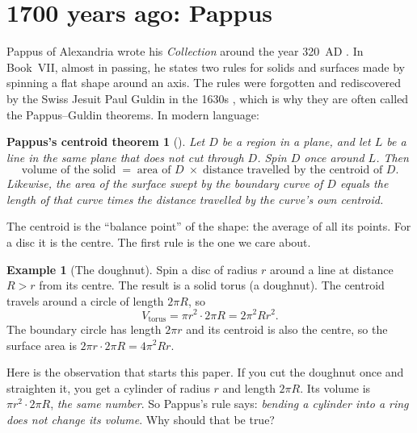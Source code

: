\documentclass[11pt]{article}
\theoremstyle{plain}
\newtheorem*{pappus}{Pappus's centroid theorem}
\theoremstyle{definition}
\newtheorem{example}[lemma]{Example}
\theoremstyle{remark}
\begin{document}
\tableofcontents

\section{1700 years ago: Pappus}\label{sec:history}

Pappus of Alexandria wrote his \emph{Collection} around the year 320~AD \cite{pappus}. In Book~VII, almost in passing, he states two rules for solids and surfaces made by spinning a flat shape around an axis. The rules were forgotten and rediscovered by the Swiss Jesuit Paul Guldin in the 1630s \cite{guldin}, which is why they are often called the Pappus--Guldin theorems. In modern language:

\begin{pappus}[\cite{pappus,guldin}]
Let $D$ be a region in a plane, and let $L$ be a line in the same plane that does not cut through $D$. Spin $D$ once around $L$. Then
\[
  \text{volume of the solid} \;=\; \text{area of } D \;\times\; \text{distance travelled by the centroid of } D .
\]
Likewise, the area of the surface swept by the boundary curve of $D$ equals the length of that curve times the distance travelled by the curve's own centroid.
\end{pappus}

The centroid is the ``balance point'' of the shape: the average of all its points. For a disc it is the centre. The first rule is the one we care about.

\begin{example}[The doughnut]\label{ex:torus}
Spin a disc of radius $r$ around a line at distance $R>r$ from its centre. The result is a solid torus (a doughnut). The centroid travels around a circle of length $2\pi R$, so
\[
  V_{\text{torus}} = \pi r^2 \cdot 2\pi R = 2\pi^2 R r^2 .
\]
The boundary circle has length $2\pi r$ and its centroid is also the centre, so the surface area is $2\pi r\cdot 2\pi R=4\pi^2Rr$.
\end{example}

Here is the observation that starts this paper. If you cut the doughnut once and straighten it, you get a cylinder of radius $r$ and length $2\pi R$. Its volume is $\pi r^2\cdot 2\pi R$, \emph{the same number}. So Pappus's rule says: \emph{bending a cylinder into a ring does not change its volume}. Why should that be true?

\end{document}
